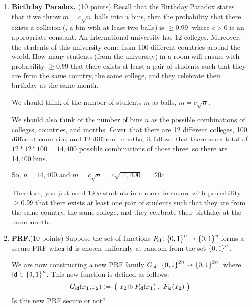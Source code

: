\documentclass[11pt]{article}
\begin{document}
\begin{enumerate}
\item {\bfseries Birthday Paradox.} (10 points)   
Recall that the Birthday Paradox states that if we throw $m= c\sqrt{n}$ balls into $n$ bins, then the probability that there exists a collision (\ie, a bin with at least two balls) is $\geq 0.99$, where $c>0$ is an appropriate constant. \newline
An international university has 12 colleges. Moreover, the students of this university come from 100 different countries around the world. How many students (from the university) in a room will ensure with probability $\geq 0.99$ that there exists at
least a pair of students such that they are from the same country, the same college, and they celebrate their birthday at the same month.
    {\bfseries

    We should think of the number of students $m$ as balls, $m=c \sqrt n$. \newline

    We should also think of the number of bins $n$ as the possible combinations of colleges, countries, and months. Given that there are 12 different colleges, 100 different countries, and 12 different months, it follows that there are a total of $12*12*100 = 14,400$ possible combinations of those three, so there are 14,400 bins. \newline

    So, $n = 14,400$ \newline
    and $m = c\sqrt n = c\sqrt{14,400} = 120c$ \newline

    Therefore, you just need $120c$ students in a room to ensure with probability $\geq 0.99$ that there exists at least one pair of students such that they are from the same country, the same college, and they celebrate their birthday at the same month.
    }
\newpage


\item
{\bfseries PRF.}(10 points) 
Suppose the set of functions $F_\mathsf{id} \colon {\{0,1\}}^n\to{\{0,1\}}^n$ forms a \ul{secure} PRF when $\mathsf{id}$ is chosen uniformly at random from the set ${\{0,1\}}^n$.

We are now constructing a new PRF family $G_\mathsf{id}\colon{\{0,1\}}^{2n}\to{\{0,1\}}^{2n}$, where $\mathsf{id}\in{\{0,1\}}^n$. 
This new function is defined as follows.
  $$ G_\mathsf{id}(x_1,x_2) {\;\vcentcolon=\;} \left( ~  x_2 \oplus F_\mathsf{id}(x_1) ~, ~ F_\mathsf{id}(x_2) ~ \right)$$
Is this new PRF secure or not? 


\end{enumerate}
\end{document}
